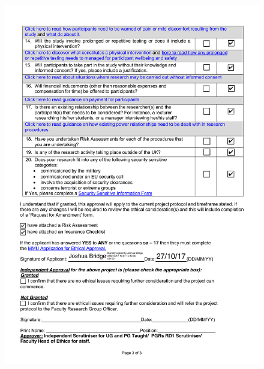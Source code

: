 \documentclass[a4paper,12pt]{report}
\begin{document}
\begin{appendices}
    \begin{figure}[h]
      \centering
      \includegraphics[scale=0.8]{ethics-checklist-3}
    \end{figure}


\end{appendices}
\end{document}
